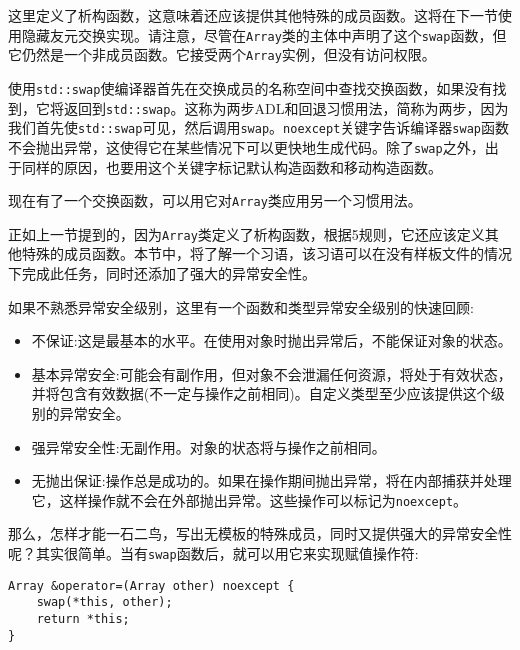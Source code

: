 这里定义了析构函数，这意味着还应该提供其他特殊的成员函数。这将在下一节使用隐藏友元交换实现。请注意，尽管在\texttt{Array}类的主体中声明了这个\texttt{swap}函数，但它仍然是一个非成员函数。它接受两个\texttt{Array}实例，但没有访问权限。

使用\texttt{std::swap}使编译器首先在交换成员的名称空间中查找交换函数，如果没有找到，它将返回到\texttt{std::swap}。这称为两步ADL和回退习惯用法，简称为两步，因为我们首先使\texttt{std::swap}可见，然后调用\texttt{swap}。\texttt{noexcept}关键字告诉编译器\texttt{swap}函数不会抛出异常，这使得它在某些情况下可以更快地生成代码。除了\texttt{swap}之外，出于同样的原因，也要用这个关键字标记默认构造函数和移动构造函数。

现在有了一个交换函数，可以用它对\texttt{Array}类应用另一个习惯用法。


正如上一节提到的，因为\texttt{Array}类定义了析构函数，根据5规则，它还应该定义其他特殊的成员函数。本节中，将了解一个习语，该习语可以在没有样板文件的情况下完成此任务，同时还添加了强大的异常安全性。

如果不熟悉异常安全级别，这里有一个函数和类型异常安全级别的快速回顾:

\begin{itemize}
\item 
不保证:这是最基本的水平。在使用对象时抛出异常后，不能保证对象的状态。

\item 
基本异常安全:可能会有副作用，但对象不会泄漏任何资源，将处于有效状态，并将包含有效数据(不一定与操作之前相同)。自定义类型至少应该提供这个级别的异常安全。

\item 
强异常安全性:无副作用。对象的状态将与操作之前相同。

\item 
无抛出保证:操作总是成功的。如果在操作期间抛出异常，将在内部捕获并处理它，这样操作就不会在外部抛出异常。这些操作可以标记为\texttt{noexcept}。
\end{itemize}

那么，怎样才能一石二鸟，写出无模板的特殊成员，同时又提供强大的异常安全性呢？其实很简单。当有\texttt{swap}函数后，就可以用它来实现赋值操作符:

\begin{lstlisting}[style=styleCXX]
Array &operator=(Array other) noexcept {
	swap(*this, other);
	return *this;
}
\end{lstlisting}

